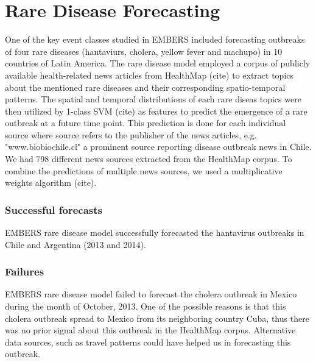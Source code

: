 \section{Rare Disease Forecasting}

One of the key event classes studied in EMBERS included forecasting outbreaks of four rare diseases (hantaviurs, cholera, yellow fever and machupo) in 10 countries of Latin America. The rare disease model employed a corpus of publicly available health-related news articles from HealthMap (cite) to extract topics about the mentioned rare diseases and their corresponding spatio-temporal patterns. The spatial and temporal distributions of each rare diseas topics were then utilized by 1-class SVM (cite) as features to predict the emergence of a rare outbreak at a future time point. This prediction is done for each individual source where source refers to the publisher of the news articles, e.g. "www.biobiochile.cl" a prominent source reporting disease outbreak news in Chile. We had 798 different news sources extracted from the HealthMap corpus. To combine the predictions of multiple news sources, we used a multiplicative weights algorithm (cite).


\subsubsection{Successful forecasts}

EMBERS rare disease model successfully forecasted the hantavirus outbreaks in Chile and Argentina (2013 and 2014).

\subsubsection{Failures}

EMBERS rare disease model failed to forecast the cholera outbreak in Mexico during the month of October, 2013. One of the possible reasons is that this cholera outbreak spread to Mexico from its neighboring country Cuba, thus there was no prior signal about this outbreak in the HealthMap corpus. Alternative data sources, such as travel patterns could have helped us in forecasting this outbreak.
